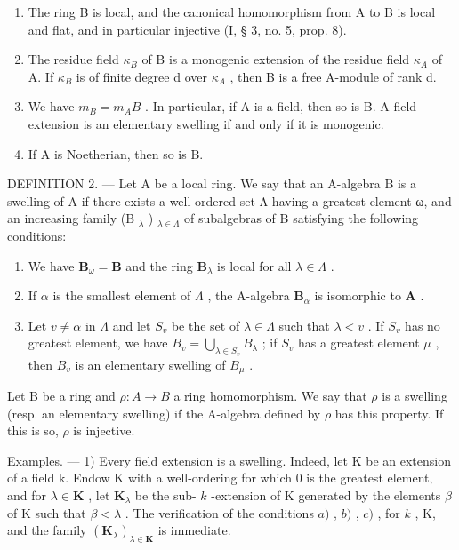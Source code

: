 \begin{enumerate}
\def\labelenumi{\alph{enumi})}
\item
  The ring B is local, and the canonical homomorphism from A to B is local and flat, and in particular injective (I, § 3, no. 5, prop. 8).
\item
  The residue field \(\kappa_{B}\) of B is a monogenic extension of the residue field \(\kappa_{A}\) of A. If \(\kappa_{B}\) is of finite degree d over \(\kappa_{A}\) , then B is a free A-module of rank d.
\item
  We have \(m_{B} = m_{A}B\) . In particular, if A is a field, then so is B. A field extension is an elementary swelling if and only if it is monogenic.
\item
  If A is Noetherian, then so is B.
\end{enumerate}

DEFINITION 2. --- Let A be a local ring. We say that an A-algebra B is a swelling of A if there exists a well-ordered set Λ having a greatest element ω, and an increasing family (B \(_{λ}\) ) \(_{λ∈Λ}\) of subalgebras of B satisfying the following conditions:

\begin{enumerate}
\def\labelenumi{\alph{enumi})}
\item
  We have \(\mathbf{B}_{\omega} = \mathbf{B}\) and the ring \(\mathbf{B}_{\lambda}\) is local for all \(\lambda \in \Lambda\) .
\item
  If \(\alpha\) is the smallest element of \(\Lambda\) , the A-algebra \(\mathbf{B}_{\alpha}\) is isomorphic to \(\mathbf{A}\) .
\item
  Let \(v \neq \alpha\) in \(\Lambda\) and let \(S_{v}\) be the set of \(\lambda \in \Lambda\) such that \(\lambda < v\) . If \(S_{v}\) has no greatest element, we have \(B_{v} = \bigcup_{\lambda \in S_{v}} B_{\lambda}\) ; if \(S_{v}\) has a greatest element \(\mu\) , then \(B_{v}\) is an elementary swelling of \(B_{\mu}\) .
\end{enumerate}

Let B be a ring and \(\rho: A \to B\) a ring homomorphism. We say that \(\rho\) is a swelling (resp. an elementary swelling) if the A-algebra defined by \(\rho\) has this property. If this is so, \(\rho\) is injective.

Examples. --- 1) Every field extension is a swelling. Indeed, let K be an extension of a field k. Endow K with a well-ordering for which 0 is the greatest element, and for \(\lambda \in \mathbf{K}\) , let \(\mathbf{K}_{\lambda}\) be the sub- \(k\) -extension of K generated by the elements \(\beta\) of K such that \(\beta < \lambda\) . The verification of the conditions \(a)\) , \(b)\) , \(c)\) , for \(k\) , K, and the family \((\mathbf{K}_{\lambda})_{\lambda \in \mathbf{K}}\) is immediate.

